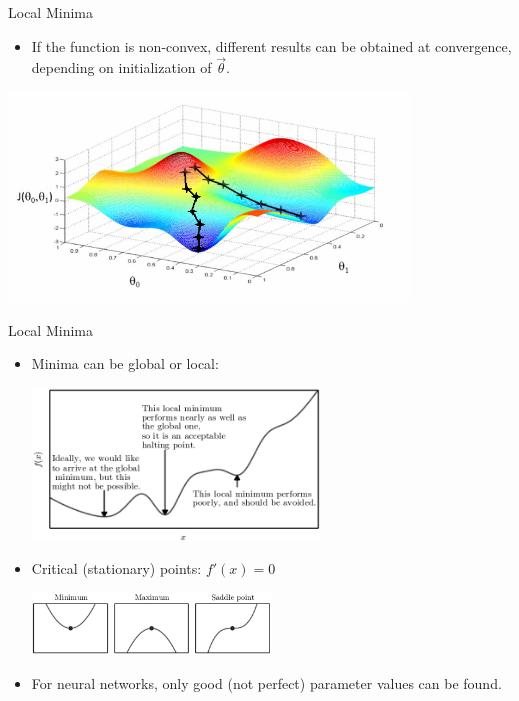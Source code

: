 
\begin{vbframe}{Local Minima}

\vfill

\begin{itemize}
\item If the function is non-convex, different results can be obtained at convergence, depending on initialization of $\vec \theta$.
\end{itemize}
\begin{center}
\includegraphics[width = 0.8\textwidth]{./figure/gradient-descent}
\end{center}

\vfill

\end{vbframe}



\begin{vbframe}{Local Minima}

\vfill

\begin{itemize}
\item Minima can be global or local:
\begin{center}
\includegraphics[width = 0.6\textwidth]{./figure/local_minima}
\end{center}
\item Critical (stationary) points:  $f'(x) = 0$
\begin{center}
\includegraphics[width = 0.5\textwidth]{./figure/critical_points}
\end{center}
\item For neural networks, only good (not perfect) parameter values can be found.
\end{itemize}

\vfill

\end{vbframe}


